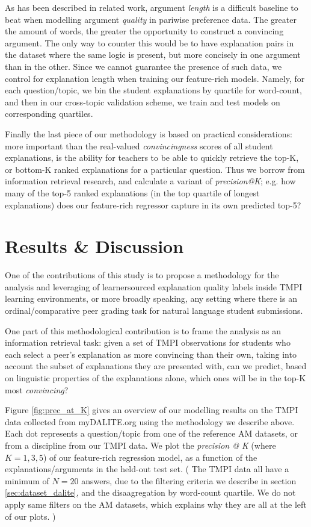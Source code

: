 \documentclass[notitlepage,12pt]{jedm}
\begin{document}
As has been described in related work, argument \textit{length} is a difficult 
baseline to beat when modelling argument \textit{quality} in pariwise 
preference data.
The greater the amount of words, the greater the opportunity to construct a 
convincing argument.
The only way to counter this would be to have explanation pairs in the dataset 
where the same logic is present, but more concisely in one argument than in the 
other.
Since we cannot guarantee the presence of such data, we control for explanation 
length when training our feature-rich models. 
Namely, for each question/topic, we bin the student explanations by quartile 
for word-count, and then in our cross-topic validation scheme, we train and 
test models on corresponding quartiles.

Finally the last piece of our methodology is based on practical considerations:
more important than the real-valued \textit{convincingness} scores of all 
student explanations, is the ability for teachers to be able to quickly 
retrieve the top-K, or bottom-K ranked explanations for a particular question.
Thus we borrow from information retrieval research, and calculate a variant of 
\textit{precision@K}; e.g. how many of the top-5 ranked explanations (in 
the top quartile of longest explanations) does our feature-rich regressor 
capture in its own predicted top-5?


\section{Results \& Discussion}\label{sec:model_results}

One of the contributions of this study is to propose a methodology for the 
analysis and leveraging of learnersourced explanation quality labels inside 
TMPI learning environments, or more broadly speaking, any setting where there 
is an ordinal/comparative peer grading task for natural language student 
submissions.

One part of this methodological contribution is to frame the analysis as an 
information retrieval task: given a set of TMPI observations for students who 
each select a peer's explanation as more convincing than their own, taking into 
account the subset of explanations they are presented with, can we 
predict, based on linguistic properties of the explanations alone, which ones 
will be in the top-K most \textit{convincing}?

Figure \ref{fig:prec_at_K} gives an overview of our modelling results on the 
TMPI data collected from myDALITE.org using the methodology we describe above.
Each dot represents a question/topic from one of the reference AM datasets, or 
from a discipline from our TMPI data.
We plot the \textit{precision @ K} (where $K={1,3,5}$) of our feature-rich 
regression model, as a function of the explanations/arguments in the held-out 
test set.
(
The TMPI data all have a minimum of $N=20$ answers, due to the filtering 
criteria we describe in section \ref{sec:dataset_dalite}, and the 
disaagregation by word-count quartile.
We do not apply same filters on the AM datasets, which explains why they are 
all at the left of our plots.
)
\end{document}
